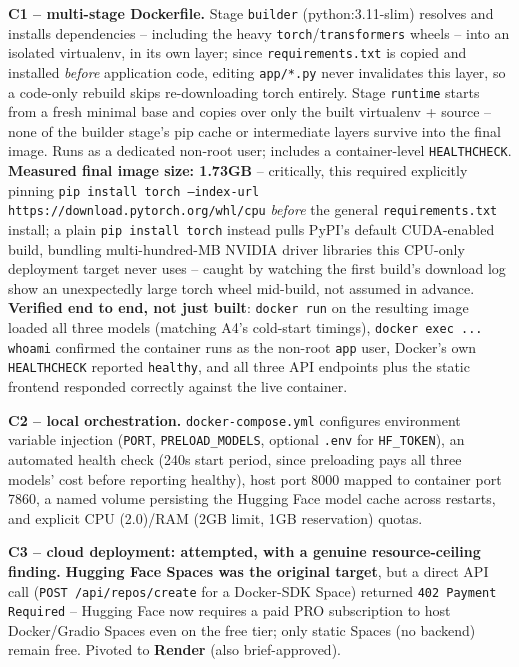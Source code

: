 \documentclass[11pt,a4paper]{article}
\begin{document}
\textbf{C1 -- multi-stage Dockerfile.} Stage \texttt{builder} (python:3.11-slim) resolves and
installs dependencies -- including the heavy \texttt{torch}/\texttt{transformers} wheels --
into an isolated virtualenv, in its own layer; since \texttt{requirements.txt} is copied and
installed \emph{before} application code, editing \texttt{app/*.py} never invalidates this
layer, so a code-only rebuild skips re-downloading torch entirely. Stage \texttt{runtime}
starts from a fresh minimal base and copies over only the built virtualenv + source -- none of
the builder stage's pip cache or intermediate layers survive into the final image. Runs as a
dedicated non-root user; includes a container-level \texttt{HEALTHCHECK}. \textbf{Measured
final image size: 1.73GB} -- critically, this required explicitly pinning
\texttt{pip install torch --index-url https://download.pytorch.org/whl/cpu} \emph{before} the
general \texttt{requirements.txt} install; a plain \texttt{pip install torch} instead pulls
PyPI's default CUDA-enabled build, bundling multi-hundred-MB NVIDIA driver libraries this
CPU-only deployment target never uses -- caught by watching the first build's download log
show an unexpectedly large torch wheel mid-build, not assumed in advance. \textbf{Verified end
to end, not just built}: \texttt{docker run} on the resulting image loaded all three models
(matching A4's cold-start timings), \texttt{docker exec ... whoami} confirmed the container
runs as the non-root \texttt{app} user, Docker's own \texttt{HEALTHCHECK} reported
\texttt{healthy}, and all three API endpoints plus the static frontend responded correctly
against the live container.

\textbf{C2 -- local orchestration.} \texttt{docker-compose.yml} configures environment variable
injection (\texttt{PORT}, \texttt{PRELOAD\_MODELS}, optional \texttt{.env} for
\texttt{HF\_TOKEN}), an automated health check (240s start period, since preloading pays all
three models' cost before reporting healthy), host port 8000 mapped to container port 7860, a
named volume persisting the Hugging Face model cache across restarts, and explicit CPU
(2.0)/RAM (2GB limit, 1GB reservation) quotas.

\textbf{C3 -- cloud deployment: attempted, with a genuine resource-ceiling finding.}
\textbf{Hugging Face Spaces was the original target}, but a direct API call
(\texttt{POST /api/repos/create} for a Docker-SDK Space) returned \texttt{402 Payment
Required} -- Hugging Face now requires a paid PRO subscription to host Docker/Gradio Spaces
even on the free tier; only static Spaces (no backend) remain free. Pivoted to
\textbf{Render} (also brief-approved).
\end{document}
